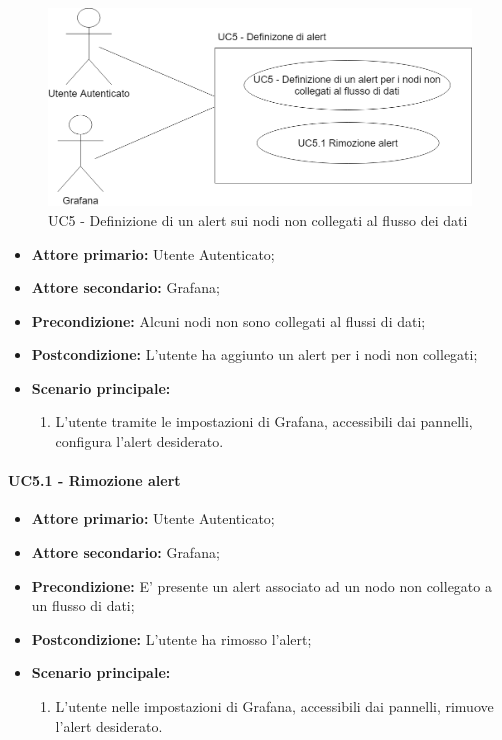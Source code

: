 \begin{figure}[H]
	\centering
	\includegraphics[scale=0.4]{./images/UC5.png}
	\caption{UC5 - Definizione di un alert sui nodi non collegati al flusso dei dati}
\end{figure}

\begin{itemize}
	\item \textbf{Attore primario:} Utente Autenticato;
	\item \textbf{Attore secondario:} Grafana;
	\item \textbf{Precondizione:} Alcuni nodi non sono collegati al flussi di dati;
	\item \textbf{Postcondizione:} L'utente ha aggiunto un alert per i nodi non collegati;
	\item \textbf{Scenario principale:}
	\begin{enumerate}
		\item L'utente tramite le impostazioni di Grafana, accessibili dai pannelli, configura l'alert desiderato.
	\end{enumerate}
\end{itemize}

\paragraph{UC5.1 - Rimozione alert}\label{UC5.1}
\begin{itemize}
	\item \textbf{Attore primario:} Utente Autenticato;
	\item \textbf{Attore secondario:} Grafana;
	\item \textbf{Precondizione:} E' presente un alert associato ad un nodo non collegato a un flusso di dati;
	\item \textbf{Postcondizione:} L'utente ha rimosso l'alert;
	\item \textbf{Scenario principale:}
	\begin{enumerate}
		\item L'utente nelle impostazioni di Grafana, accessibili dai pannelli, rimuove l'alert desiderato.
	\end{enumerate}
\end{itemize}

